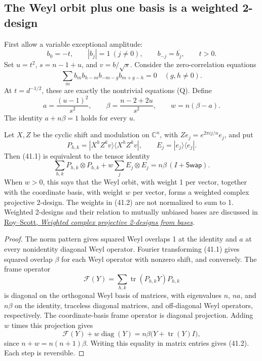 \documentclass[11pt,reqno]{amsart}
\theoremstyle{plain}
\begin{document}
\subsection{The Weyl orbit plus one basis is a weighted 2-design}\label{sec:41.1}

First allow a variable exceptional amplitude:
\[
 b_0=-t,\qquad |b_j|=1\ (j\ne0),\qquad b_{-j}=\overline{b_j},
 \qquad t>0.
\]
Set \(u=t^2\), \(s=n-1+u\), and \(v=b/\sqrt s\).
Consider the zero-correlation equations
\begin{equation*}
 \sum_m b_m b_{h-m}b_{-m-g}b_{m+g-h}=0
 \quad(g,h\ne0). \tag{41.1}
\end{equation*}
At \(t=d^{-1/2}\), these are exactly the nontrivial equations (Q).
Define
\[
 a=\frac{(u-1)^2}{s^2},\qquad
 \beta=\frac{n-2+2u}{s^2},\qquad w=n(\beta-a).
\]
The identity \(a+n\beta=1\) holds for every \(u\).

Let \(X,Z\) be the cyclic shift and modulation on \(\mathbb C^n\),
with \(Ze_j=e^{2\pi ij/n}e_j\), and put
\[
 P_{h,k}=|X^hZ^kv\rangle\langle X^hZ^kv|,
 \qquad E_j=|e_j\rangle\langle e_j|.
\]
Then (41.1) is equivalent to the tensor identity
\begin{equation*}
 \boxed{\quad
 \sum_{h,k}P_{h,k}\otimes P_{h,k}
   +w\sum_j E_j\otimes E_j
  =n\beta\,(I+\mathsf{Swap}).\quad} \tag{41.2}
\end{equation*}
When \(w>0\), this says that the Weyl orbit, with weight 1 per
vector, together with the coordinate basis, with weight \(w\) per
vector, forms a weighted complex projective 2-design. The weights
in (41.2) are not normalized to sum to 1. Weighted 2-designs and their
relation to mutually unbiased bases are discussed in
\href{https://arxiv.org/abs/quant-ph/0703025}{Roy--Scott, \emph{Weighted complex projective 2-designs from bases}}.

\begin{proof}
The norm pattern gives squared Weyl overlaps 1 at the
identity and \(a\) at every nonidentity diagonal Weyl operator.
Fourier transforming (41.1) gives squared overlap \(\beta\) for
each Weyl operator with nonzero shift, and conversely. The frame
operator
\[
 \mathcal F(Y)=\sum_{h,k}\operatorname{tr}(P_{h,k}Y)P_{h,k}
\]
is diagonal on the orthogonal Weyl basis of matrices, with eigenvalues
\(n\), \(na\), and \(n\beta\) on the identity, traceless
diagonal matrices, and off-diagonal Weyl operators, respectively.
The coordinate-basis frame operator is diagonal projection. Adding
\(w\) times this projection gives
\[
 \mathcal F(Y)+w\operatorname{diag}(Y)
   =n\beta\bigl(Y+\operatorname{tr}(Y)I\bigr),
\]
since \(n+w=n(n+1)\beta\). Writing this equality in matrix
entries gives (41.2). Each step is reversible.
\end{proof}
\end{document}
